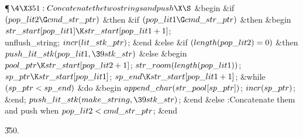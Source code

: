 \Y\P$\4\X351:Concatenate the two strings and push\X\S$\6
\&{begin} \&{if} $(\\{pop\_lit2}\G\\{cmd\_str\_ptr})$ \1\&{then}\6
\&{if} $(\\{pop\_lit1}\G\\{cmd\_str\_ptr})$ \1\&{then}\6
\&{begin} $\\{str\_start}[\\{pop\_lit1}]\K\\{str\_start}[\\{pop\_lit1}+1]$;\5
\\{unflush\_string};\5
$\\{incr}(\\{lit\_stk\_ptr})$;\6
\&{end}\6
\4\&{else} \&{if} $(\\{length}(\\{pop\_lit2})=0)$ \1\&{then}\5
$\\{push\_lit\_stk}(\\{pop\_lit1},\39\\{stk\_str})$\6
\4\&{else} \2\2\2\6
\&{begin} $\\{pool\_ptr}\K\\{str\_start}[\\{pop\_lit2}+1]$;\5
$\\{str\_room}(\\{length}(\\{pop\_lit1}))$;\5
$\\{sp\_ptr}\K\\{str\_start}[\\{pop\_lit1}]$;\5
$\\{sp\_end}\K\\{str\_start}[\\{pop\_lit1}+1]$;\6
\&{while} $(\\{sp\_ptr}<\\{sp\_end})$ \1\&{do}\6
\&{begin} $\\{append\_char}(\\{str\_pool}[\\{sp\_ptr}])$;\5
$\\{incr}(\\{sp\_ptr})$;\6
\&{end};\2\6
$\\{push\_lit\_stk}(\\{make\_string},\39\\{stk\_str})$;\6
\&{end}\6
\4\&{else} :Concatenate them and push when $\\{pop\_lit2}<\\{cmd\_str%
\_ptr}$\X;\6
\&{end}\par
\U350.\fi

